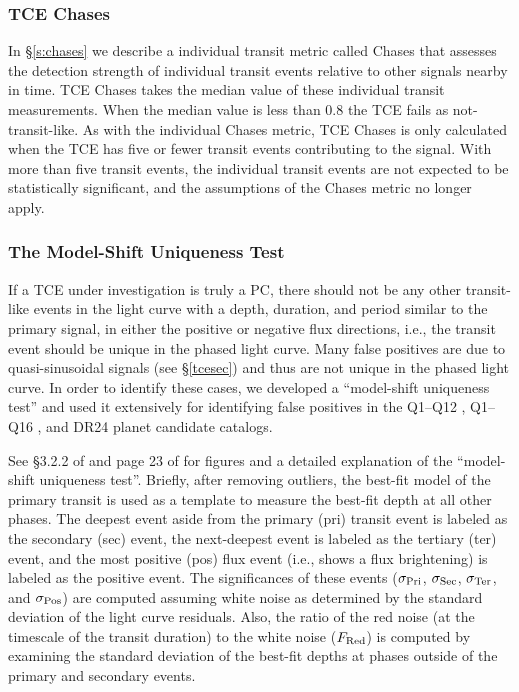 


\subsubsection{TCE Chases}
\label{s:tcechases}

In \S\ref{s:chases} we describe a individual transit metric called Chases that assesses the detection strength of individual transit events relative to other signals nearby in time. TCE Chases takes the median value of these individual transit measurements.  When the median value is less than 0.8 the TCE fails as not-transit-like.  As with the individual Chases metric, TCE Chases is only calculated when the TCE has five or fewer transit events contributing to the signal.  With more than five transit events, the individual transit events are not expected to be statistically significant, and the assumptions of the Chases metric no longer apply.


\subsubsection{The Model-Shift Uniqueness Test}
\label{s:ms}

If a TCE under investigation is truly a PC, there should not be any other transit-like events in the light curve with a depth, duration, and period similar to the primary signal, in either the positive or negative flux directions, i.e., the transit event should be unique in the phased light curve. Many false positives are due to quasi-sinusoidal signals (see \S\ref{tcesec}) and thus are not unique in the phased light curve. In order to identify these cases, we developed a ``model-shift uniqueness test'' and used it extensively for identifying false positives in the Q1--Q12 \citep{Rowe2015a}, Q1--Q16 \citep{Mullally2015cat}, and DR24 \citep{Coughlin2016} planet candidate catalogs.

See \S3.2.2 of \citet{Rowe2015a} and page 23 of \citet{Coughlin2017b} for figures and a detailed explanation of the ``model-shift uniqueness test''. Briefly, after removing outliers, the best-fit model of the primary transit is used as a template to measure the best-fit depth at all other phases. The deepest event aside from the primary (pri) transit event is labeled as the secondary (sec) event, the next-deepest event is labeled as the tertiary (ter) event, and the most positive (pos) flux event (i.e., shows a flux brightening) is labeled as the positive event. The significances of these events ($\sigma_{\rm Pri}$, $\sigma_{\rm Sec}$, $\sigma_{\rm Ter}$, and $\sigma_{\rm Pos}$) are computed assuming white noise as determined by the standard deviation of the light curve residuals. Also, the ratio of the red noise (at the timescale of the transit duration) to the white noise ($F_{\rm Red}$) is computed by examining the standard deviation of the best-fit depths at phases outside of the primary and secondary events.  

